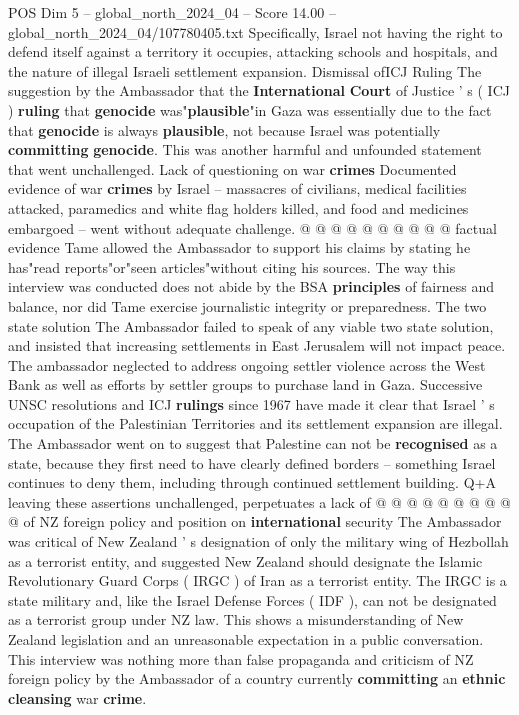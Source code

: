 \begin{textsample}{POS Dim 5 – global\_north\_2024\_04 – Score 14.00 – global\_north\_2024\_04/107780405.txt}
Specifically, Israel not having the right to defend itself against a territory it occupies, attacking schools and hospitals, and the nature of illegal Israeli settlement expansion.
Dismissal ofICJ Ruling The suggestion by the Ambassador that the \textbf{International} \textbf{Court} of Justice ' s ( ICJ ) \textbf{ruling} that \textbf{genocide} was"\textbf{plausible}"in Gaza was essentially due to the fact that \textbf{genocide} is always \textbf{plausible}, not because Israel was potentially \textbf{committing} \textbf{genocide}.
This was another harmful and unfounded statement that went unchallenged.
Lack of questioning on war \textbf{crimes} Documented evidence of war \textbf{crimes} by Israel -- massacres of civilians, medical facilities attacked, paramedics and white flag holders killed, and food and medicines embargoed -- went without adequate challenge. @ @ @ @ @ @ @ @ @ @ factual evidence Tame allowed the Ambassador to support his claims by stating he has"read reports"or"seen articles"without citing his sources.
The way this interview was conducted does not abide by the BSA \textbf{principles} of fairness and balance, nor did Tame exercise journalistic integrity or preparedness.
The two state solution The Ambassador failed to speak of any viable two state solution, and insisted that increasing settlements in East Jerusalem will not impact peace.
The ambassador neglected to address ongoing settler violence across the West Bank as well as efforts by settler groups to purchase land in Gaza.
Successive UNSC resolutions and ICJ \textbf{rulings} since 1967 have made it clear that Israel ' s occupation of the Palestinian Territories and its settlement expansion are illegal.
The Ambassador went on to suggest that Palestine can not be \textbf{recognised} as a state, because they first need to have clearly defined borders -- something Israel continues to deny them, including through continued settlement building.
Q+A leaving these assertions unchallenged, perpetuates a lack of @ @ @ @ @ @ @ @ @ @ of NZ foreign policy and position on \textbf{international} security The Ambassador was critical of New Zealand ' s designation of only the military wing of Hezbollah as a terrorist entity, and suggested New Zealand should designate the Islamic Revolutionary Guard Corps ( IRGC ) of Iran as a terrorist entity.
The IRGC is a state military and, like the Israel Defense Forces ( IDF ), can not be designated as a terrorist group under NZ law.
This shows a misunderstanding of New Zealand legislation and an unreasonable expectation in a public conversation.
This interview was nothing more than false propaganda and criticism of NZ foreign policy by the Ambassador of a country currently \textbf{committing} an \textbf{ethnic} \textbf{cleansing} war \textbf{crime}.

\end{textsample}
